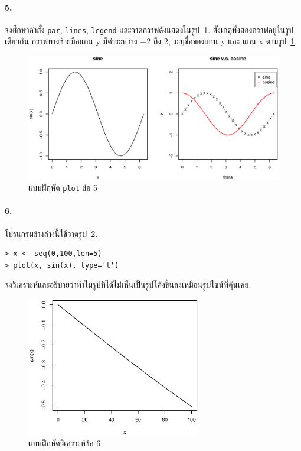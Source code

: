 \paragraph{5.} จงศึกษาคำสั่ง \verb|par|, \verb|lines|, \verb|legend| และวาดกราฟดังแสดงในรูป~\ref{fig: R plot ex2}.
สังเกตุทั้งสองกราฟอยู่ในรูปเดียวกัน กราฟทางซ้ายมือแกน y มีค่าระหว่าง $-2$ ถึง $2$, ระบุชื่อของแกน y และ แกน x ตามรูป~\ref{fig: R plot ex2}.

%
\begin{figure}
\begin{center}
\includegraphics[width=6.0in]
{01Intro/RplotEx2.eps}
\end{center}
\caption{แบบฝึกหัด \texttt{plot} ข้อ 5}
\label{fig: R plot ex2}
\end{figure}
%

\paragraph{6.} โปรแกรมข้างล่างนี้ใช้วาดรูป~\ref{fig: R plot ex3}.
\begin{verbatim}
> x <- seq(0,100,len=5)
> plot(x, sin(x), type='l')
\end{verbatim}
จงวิเคราะห์และอธิบายว่าทำไมรูปที่ได้ไม่เห็นเป็นรูปโค้งขึ้นลงเหมือนรูปไซน์ที่คุ้นเคย.

%
\begin{figure}
\begin{center}
\includegraphics[width=3.0in]
{01Intro/RplotEx3.eps}
\end{center}
\caption{แบบฝึกหัดวิเคราะห์ข้อ 6}
\label{fig: R plot ex3}
\end{figure}
%

